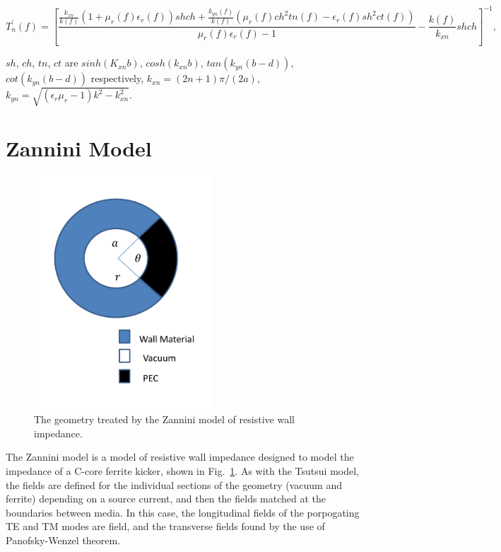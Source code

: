 \begin{equation}
T^{'}_{n}\left(f \right) = \left[ \frac{\frac{k_{xn}}{k\left(f \right)}\left( 1 + \mu_{r}\left(f \right)\epsilon_{r}\left(f \right) \right)sh ch + \frac{k_{yn}\left(f \right)}{k\left(f \right)} \left( \mu_{r}\left(f \right)ch^{2} tn\left(f \right) - \epsilon_{r}\left(f \right) sh^{2} ct\left(f \right) \right)}{\mu_{r}\left(f \right)\epsilon_{r}\left(f \right) -1} - \frac{k\left(f \right)}{k_{xn}}sh ch \right]^{-1},
\end{equation}

$sh$, $ch$, $tn$, $ct$ are $sinh(K_{xn}b)$, $cosh(k_{xn}b)$, $tan(k_{yn}(b-d))$, $cot(k_{yn}(b-d))$ respectively, $k_{xn} = (2n+1)\pi /(2a)$, $k_{yn}=\sqrt{(\epsilon_{r}\mu_{r} -1)k^{2} - k_{xn}^{2}}$.

\section{Zannini Model}

\begin{figure}
\begin{center}
\includegraphics[width=0.6\textwidth]{appendices/figures/zannini-model-geo.pdf}
\end{center}
\caption{The geometry treated by the Zannini model of resistive wall impedance.}
\label{fig:ZanniniGeo}
\end{figure}

The Zannini model is a model of resistive wall impedance designed to model the impedance of a C-core ferrite kicker, shown in Fig.~\ref{fig:ZanniniGeo}. As with the Tsutsui model, the fields are defined for the individual sections of the geometry (vacuum and ferrite) depending on a source current, and then the fields matched at the boundaries between media. In this case, the longitudinal fields of the porpogating TE and TM modes are field, and the transverse fields found by the use of Panofsky-Wenzel theorem.

